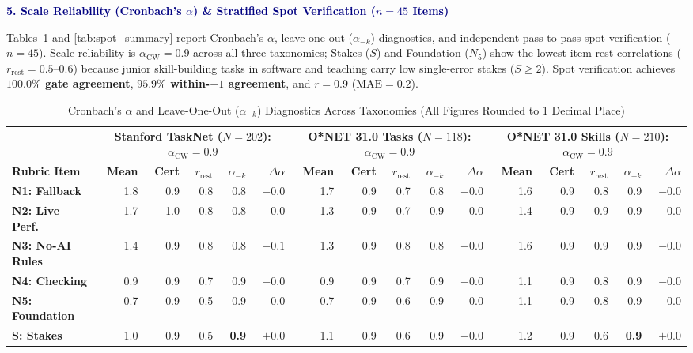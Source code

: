 \documentclass[9pt,letterpaper]{extarticle}
\begin{document}
\vspace{-3pt}
{\normalsize\sffamily\bfseries\textcolor{navy}{5. Scale Reliability (Cronbach's $\alpha$) \& Stratified Spot Verification ($n=45$ Items)}}

Tables~\ref{tab:cronbach} and \ref{tab:spot_summary} report Cronbach's $\alpha$, leave-one-out ($\alpha_{-k}$) diagnostics, and independent pass-to-pass spot verification ($n=45$). Scale reliability is $\alpha_{\text{CW}} = \mathbf{0.9}$ across all three taxonomies; Stakes ($S$) and Foundation ($N_5$) show the lowest item-rest correlations ($r_{\text{rest}} = 0.5\text{--}0.6$) because junior skill-building tasks in software and teaching carry low single-error stakes ($S \ge 2$). Spot verification achieves \textbf{$100.0\%$ gate agreement}, \textbf{$95.9\%$ within-$\pm 1$ agreement}, and \textbf{$r=0.9$} ($\text{MAE}=0.2$).

\begin{table}[h!]
\centering
\caption{Cronbach's $\alpha$ and Leave-One-Out ($\alpha_{-k}$) Diagnostics Across Taxonomies (All Figures Rounded to 1 Decimal Place)}
\label{tab:cronbach}
\scriptsize
\begin{tabularx}{\textwidth}{@{}l r r r r r | r r r r r | r r r r r@{}}
\toprule
& \multicolumn{5}{c|}{\textbf{Stanford TaskNet ($N=202$): $\alpha_{\text{CW}} = \mathbf{0.9}$}} & \multicolumn{5}{c|}{\textbf{O*NET 31.0 Tasks ($N=118$): $\alpha_{\text{CW}} = \mathbf{0.9}$}} & \multicolumn{5}{c}{\textbf{O*NET 31.0 Skills ($N=210$): $\alpha_{\text{CW}} = \mathbf{0.9}$}} \\
\cmidrule(lr){2-6} \cmidrule(lr){7-11} \cmidrule(l){12-16}
\textbf{Rubric Item} & \textbf{Mean} & \textbf{Cert} & \textbf{$r_{\text{rest}}$} & \textbf{$\alpha_{-k}$} & \textbf{$\Delta\alpha$} & \textbf{Mean} & \textbf{Cert} & \textbf{$r_{\text{rest}}$} & \textbf{$\alpha_{-k}$} & \textbf{$\Delta\alpha$} & \textbf{Mean} & \textbf{Cert} & \textbf{$r_{\text{rest}}$} & \textbf{$\alpha_{-k}$} & \textbf{$\Delta\alpha$} \\
\midrule
\textbf{N1: Fallback} & 1.8 & 0.9 & 0.8 & 0.8 & $-0.0$ & 1.7 & 0.9 & 0.7 & 0.8 & $-0.0$ & 1.6 & 0.9 & 0.8 & 0.9 & $-0.0$ \\
\textbf{N2: Live Perf.} & 1.7 & 1.0 & 0.8 & 0.8 & $-0.0$ & 1.3 & 0.9 & 0.7 & 0.9 & $-0.0$ & 1.4 & 0.9 & 0.9 & 0.9 & $-0.0$ \\
\textbf{N3: No-AI Rules} & 1.4 & 0.9 & 0.8 & 0.8 & $-0.1$ & 1.3 & 0.9 & 0.8 & 0.8 & $-0.0$ & 1.6 & 0.9 & 0.9 & 0.9 & $-0.0$ \\
\textbf{N4: Checking} & 0.9 & 0.9 & 0.7 & 0.9 & $-0.0$ & 0.9 & 0.9 & 0.7 & 0.9 & $-0.0$ & 1.1 & 0.9 & 0.8 & 0.9 & $-0.0$ \\
\textbf{N5: Foundation} & 0.7 & 0.9 & 0.5 & 0.9 & $-0.0$ & 0.7 & 0.9 & 0.6 & 0.9 & $-0.0$ & 1.1 & 0.9 & 0.8 & 0.9 & $-0.0$ \\
\textbf{S: Stakes} & 1.0 & 0.9 & 0.5 & \textbf{0.9} & $\mathbf{+0.0}$ & 1.1 & 0.9 & 0.6 & 0.9 & $-0.0$ & 1.2 & 0.9 & 0.6 & \textbf{0.9} & $\mathbf{+0.0}$ \\
\bottomrule
\end{tabularx}
\end{table}
\end{document}
